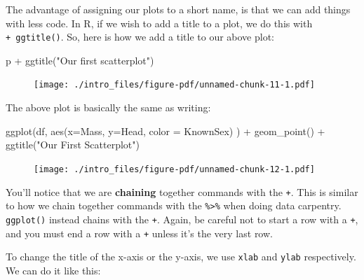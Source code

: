 \documentclass[
  letterpaper,
  DIV=11,
  numbers=noendperiod]{scrreprt}
\newenvironment{Shaded}{\begin{snugshade}}{\end{snugshade}}
\newcommand{\AttributeTok}[1]{\textcolor[rgb]{0.40,0.45,0.13}{#1}}
\newcommand{\FunctionTok}[1]{\textcolor[rgb]{0.28,0.35,0.67}{#1}}
\newcommand{\NormalTok}[1]{\textcolor[rgb]{0.00,0.23,0.31}{#1}}
\newcommand{\SpecialCharTok}[1]{\textcolor[rgb]{0.37,0.37,0.37}{#1}}
\newcommand{\StringTok}[1]{\textcolor[rgb]{0.13,0.47,0.30}{#1}}
\begin{document}
The advantage of assigning our plots to a short name, is that we can add
things with less code. In R, if we wish to add a title to a plot, we do
this with \texttt{+\ ggtitle()}. So, here is how we add a title to our
above plot:

\begin{Shaded}
\begin{Highlighting}[]
\NormalTok{p }\SpecialCharTok{+} \FunctionTok{ggtitle}\NormalTok{(}\StringTok{"Our first scatterplot"}\NormalTok{)}
\end{Highlighting}
\end{Shaded}

\begin{figure}[H]

{\centering \texttt{[image: ./intro\_files/figure-pdf/unnamed-chunk-11-1.pdf]}

}

\end{figure}

The above plot is basically the same as writing:

\begin{Shaded}
\begin{Highlighting}[]
\FunctionTok{ggplot}\NormalTok{(df, }\FunctionTok{aes}\NormalTok{(}\AttributeTok{x=}\NormalTok{Mass, }\AttributeTok{y=}\NormalTok{Head, }\AttributeTok{color =}\NormalTok{ KnownSex) ) }\SpecialCharTok{+} 
  \FunctionTok{geom\_point}\NormalTok{() }\SpecialCharTok{+}
  \FunctionTok{ggtitle}\NormalTok{(}\StringTok{"Our First Scatterplot"}\NormalTok{)}
\end{Highlighting}
\end{Shaded}

\begin{figure}[H]

{\centering \texttt{[image: ./intro\_files/figure-pdf/unnamed-chunk-12-1.pdf]}

}

\end{figure}

You'll notice that we are \textbf{chaining} together commands with the
\texttt{+}. This is similar to how we chain together commands with the
\texttt{\%\textgreater{}\%} when doing data carpentry. \texttt{ggplot()}
instead chains with the \texttt{+}. Again, be careful not to start a row
with a \texttt{+}, and you must end a row with a \texttt{+} unless it's
the very last row.

To change the title of the x-axis or the y-axis, we use \texttt{xlab}
and \texttt{ylab} respectively. We can do it like this:
\end{document}
